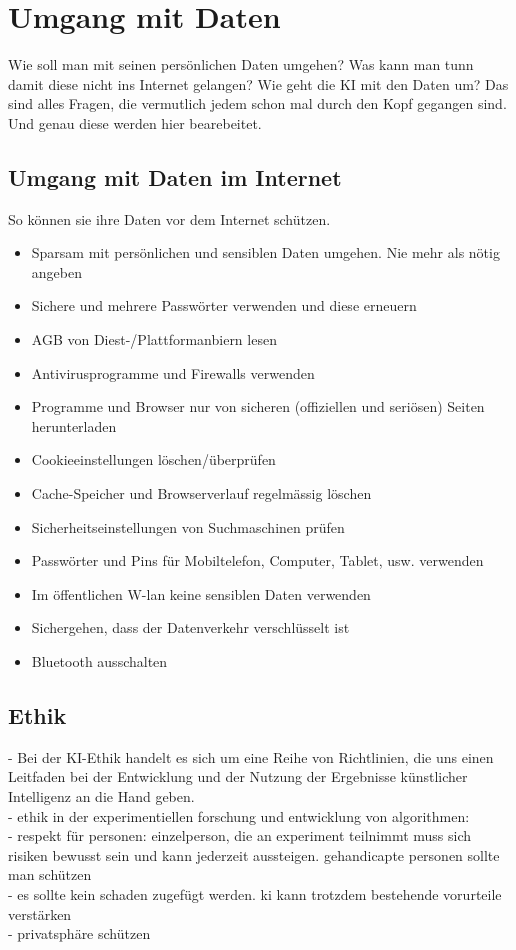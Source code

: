 \chapter{Umgang mit Daten}
\label{chap:daten}

Wie soll man mit seinen persönlichen Daten umgehen? Was kann man tunn damit diese nicht ins Internet gelangen? Wie geht die KI mit den Daten um?
Das  sind alles Fragen, die vermutlich jedem schon mal durch den Kopf gegangen sind. Und genau diese werden hier bearebeitet.

\section{Umgang mit Daten im Internet}
So können sie ihre Daten vor dem Internet schützen.

\begin{itemize}
    \item Sparsam mit persönlichen und sensiblen Daten umgehen. Nie mehr als nötig angeben
    \item Sichere und mehrere Passwörter verwenden und diese erneuern
    \item AGB von Diest-/Plattformanbiern lesen
    \item Antivirusprogramme und Firewalls verwenden
    \item Programme und Browser nur von sicheren (offiziellen und seriösen) Seiten herunterladen
    \item Cookieeinstellungen löschen/überprüfen
    \item Cache-Speicher und Browserverlauf regelmässig löschen
    \item Sicherheitseinstellungen von Suchmaschinen prüfen
    \item Passwörter und Pins für Mobiltelefon, Computer, Tablet, usw. verwenden
    \item Im öffentlichen W-lan keine sensiblen Daten verwenden
    \item Sichergehen, dass der Datenverkehr verschlüsselt ist
    \item Bluetooth ausschalten
\end{itemize}
\citep{datenschutz}

\section{Ethik}
-  Bei der KI-Ethik handelt es sich um eine Reihe von Richtlinien, die uns einen Leitfaden bei der Entwicklung und der Nutzung der Ergebnisse künstlicher Intelligenz an die Hand geben.\\
-  ethik in der experimentiellen forschung und entwicklung von algorithmen:\\
- respekt für personen: einzelperson, die an experiment teilnimmt muss sich risiken bewusst sein und kann jederzeit aussteigen. gehandicapte personen sollte man schützen\\
- es sollte kein schaden zugefügt werden. ki kann trotzdem bestehende vorurteile verstärken\\
- privatsphäre schützen

\citep{ibm}
